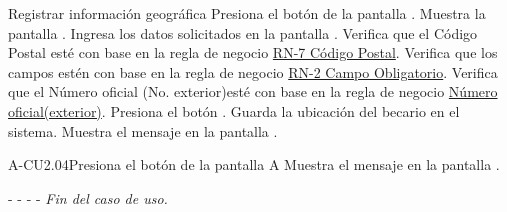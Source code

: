 	\begin{UCtrayectoria}{Registrar información geográfica }
		\UCpaso[\UCactor] Presiona el botón  de la pantalla .
		\UCpaso[\UCsist] Muestra la pantalla .
	    \UCpaso[\UCactor] Ingresa los datos solicitados en la pantalla .
	    \UCpaso[\UCsist] Verifica que el Código Postal esté con base en la regla de negocio \hyperlink{RN7}{RN-7 C\'odigo Postal}. 
	    \UCpaso[\UCsist] Verifica que los campos estén con base en la regla de negocio \hyperlink{RN2}{RN-2 Campo Obligatorio}. 
	    \UCpaso[\UCsist] Verifica que el Número oficial (No. exterior)esté con base en la regla de negocio \hyperlink{RN12}{Número oficial(exterior)}. 
		\UCpaso[\UCactor] Presiona el botón . 
		\UCpaso[\UCsist] Guarda la ubicación del becario en el sistema. 
		\UCpaso[\UCsist] Muestra el mensaje  en la pantalla .

		
	\end{UCtrayectoria}
	

	
	

	
	
	\begin{UCtrayectoriaA}{A-CU2.04}{Presiona el botón  de la pantalla }{A}
		\UCpaso[\UCsist] Muestra el mensaje  en la pantalla .
		\item[- -] - - {\em Fin del caso de uso.} 
	\end{UCtrayectoriaA}

